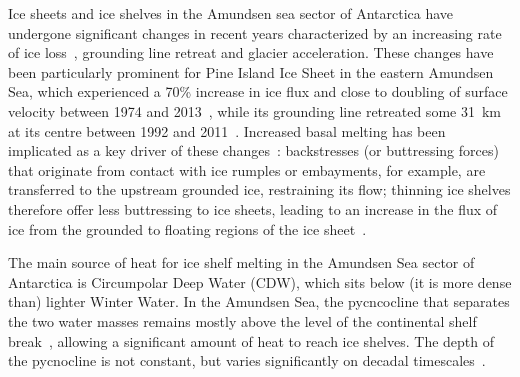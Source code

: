 \documentclass[draft]{agujournal2019}
\begin{document}
Ice sheets and ice shelves in the Amundsen sea sector of Antarctica have undergone significant changes in recent years characterized by an increasing rate of ice loss~\cite{Paolo2015Science}, grounding line retreat and glacier acceleration. These changes have been particularly prominent for Pine Island Ice Sheet in the eastern Amundsen Sea, which experienced a 70\% increase in ice flux and close to doubling of surface velocity between 1974 and 2013~\cite{Mouginot2014GRL}, while its grounding line retreated some 31~km at its centre between 1992 and 2011~\cite{Rignot2014GRL}. Increased basal melting has been implicated as a key driver of these changes~\cite{Pritchard2012Nature}: backstresses (or buttressing forces) that originate from contact with ice rumples or embayments, for example, are transferred to the upstream grounded ice, restraining its flow; thinning ice shelves therefore offer less buttressing to ice sheets, leading to an increase in the flux of ice from the grounded to floating regions of the ice sheet~\cite{Gudmundsson2013Cryo, Gudmundsson2019GRL,Gagliardini2010GRL,Goldberg2019GRL}.

The main source of heat for ice shelf melting in the Amundsen Sea sector of Antarctica is Circumpolar Deep Water (CDW), which sits below (it is more dense than) lighter Winter Water. In the Amundsen Sea, the pycncocline that separates the two water masses remains mostly above the level of the continental shelf break~\cite{Heywood2016Oceanography}, allowing a significant amount of heat to reach ice shelves. The depth of the pycnocline is not constant, but varies significantly on decadal timescales~\cite{Jenkins2018NatureGeo}. 
\end{document}
